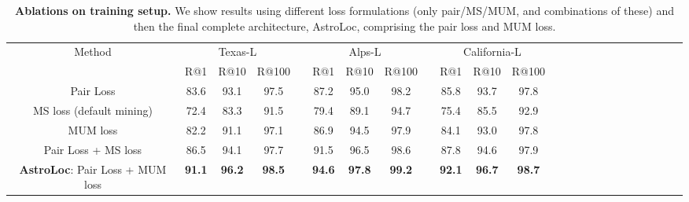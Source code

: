 
\begin{table}
\begin{center}
\begin{adjustbox}{width=0.999\columnwidth}
\begin{tabular}{c|ccc c ccc c ccc c ccc c ccc c ccc}
\toprule
\multirow{2}{*}{Method} & 
\multicolumn{3}{c}{Texas-L} &&
\multicolumn{3}{c}{Alps-L} &&
\multicolumn{3}{c}{California-L}
\\
\cline{2-4} \cline{6-8} \cline{10-12} %
& R@1 & R@10 & R@100 &
& R@1 & R@10 & R@100 &
& R@1 & R@10 & R@100 \\ %
\midrule
Pair Loss & 
83.6 & 93.1 & 97.5 & & 87.2 & 95.0 & 98.2 & & 85.8 & 93.7 & 97.8 \\ %
MS loss (default mining) & 
72.4 & 83.3 & 91.5 & & 79.4 & 89.1 & 94.7 & & 75.4 & 85.5 & 92.9 \\ %
MUM loss & 
82.2 & 91.1 & 97.1 & & 86.9 & 94.5 & 97.9 & & 84.1 & 93.0 & 97.8 \\ %
Pair Loss + MS loss &
86.5 & 94.1 & 97.7 & & 91.5 & 96.5 & 98.6 & & 87.8 & 94.6 & 97.9 \\ %
\textbf{AstroLoc}: Pair Loss + MUM loss &
\textbf{91.1} & \textbf{96.2} & \textbf{98.5} & & \textbf{94.6} & \textbf{97.8} & \textbf{99.2} & & \textbf{92.1} & \textbf{96.7} & \textbf{98.7}
\\
\bottomrule
\end{tabular}
\end{adjustbox}
\end{center}
\vspace{-4mm}
\caption{\textbf{Ablations on training setup.} We show results using different loss formulations (only pair/MS/MUM, and combinations of these) and then the final complete architecture, AstroLoc, comprising the pair loss and MUM loss.}
\vspace{-2mm}
\label{tab:ablation}
\end{table}
